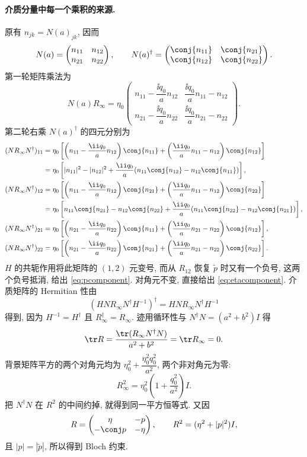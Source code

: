 \paragraph{介质分量中每一个乘积的来源.}
原有 $n_{jk}=N(a)_{jk}$, 因而
\[
N(a)=\begin{pmatrix}n_{11}&n_{12}\\n_{21}&n_{22}\end{pmatrix},\qquad
N(a)^\dagger=
\begin{pmatrix}\conj{n_{11}}&\conj{n_{21}}\\
\conj{n_{12}}&\conj{n_{22}}\end{pmatrix}.
\]
第一轮矩阵乘法为
\[
N(a)R_\infty
=\eta_0\begin{pmatrix}
n_{11}-\dfrac{\ii q_0}{a}n_{12}
&\dfrac{\ii q_0}{a}n_{11}-n_{12}\\
n_{21}-\dfrac{\ii q_0}{a}n_{22}
&\dfrac{\ii q_0}{a}n_{21}-n_{22}
\end{pmatrix}.
\]
第二轮右乘 $N(a)^\dagger$ 的四元分别为
\[
\begin{aligned}
(N R_\infty N^\dagger)_{11}
={}&\eta_0\left[
\left(n_{11}-\dfrac{\ii q_0}{a}n_{12}\right)\conj{n_{11}}
+\left(\dfrac{\ii q_0}{a}n_{11}-n_{12}\right)\conj{n_{12}}
\right]\\
={}&\eta_0\left[
|n_{11}|^2-|n_{12}|^2
+\dfrac{\ii q_0}{a}
(n_{11}\conj{n_{12}}-n_{12}\conj{n_{11}})
\right],\\
(N R_\infty N^\dagger)_{12}
={}&\eta_0\left[
\left(n_{11}-\dfrac{\ii q_0}{a}n_{12}\right)\conj{n_{21}}
+\left(\dfrac{\ii q_0}{a}n_{11}-n_{12}\right)\conj{n_{22}}
\right]\\
={}&\eta_0\left[
n_{11}\conj{n_{21}}-n_{12}\conj{n_{22}}
+\dfrac{\ii q_0}{a}
(n_{11}\conj{n_{22}}-n_{12}\conj{n_{21}})
\right],\\
(N R_\infty N^\dagger)_{21}
={}&\eta_0\left[
\left(n_{21}-\dfrac{\ii q_0}{a}n_{22}\right)\conj{n_{11}}
+\left(\dfrac{\ii q_0}{a}n_{21}-n_{22}\right)\conj{n_{12}}
\right],\\
(N R_\infty N^\dagger)_{22}
={}&\eta_0\left[
\left(n_{21}-\dfrac{\ii q_0}{a}n_{22}\right)\conj{n_{21}}
+\left(\dfrac{\ii q_0}{a}n_{21}-n_{22}\right)\conj{n_{22}}
\right].
\end{aligned}
\]
$H$ 的共轭作用将此矩阵的 $(1,2)$ 元变号,
而从 $R_{12}$ 恢复 $\widetilde p$ 时又有一个负号,
这两个负号抵消, 给出 \eqref{eq:pcomponent}.
对角元不变, 直接给出 \eqref{eq:etacomponent}.
介质矩阵的 Hermitian 性由
\[
(HN R_\infty N^\dagger H^{-1})^\dagger
=HN R_\infty N^\dagger H^{-1}
\]
得到, 因为 $H^{-1}=H^\dagger$ 且 $R_\infty^\dagger=R_\infty$.
迹用循环性与 $N^\dagger N=(a^2+b^2)I$ 得
\[
\tr R
=\dfrac{\tr(R_\infty N^\dagger N)}{a^2+b^2}
=\tr R_\infty=0.
\]
背景矩阵平方的两个对角元均为
$\eta_0^2+\dfrac{\eta_0^2q_0^2}{a^2}$, 两个非对角元为零:
\[
R_\infty^2
=\eta_0^2\left(1+\dfrac{q_0^2}{a^2}\right)I.
\]
把 $N^\dagger N$ 在 $R^2$ 的中间约掉, 就得到同一平方恒等式.
又因
\[
R=\begin{pmatrix}\eta&-p\\-\conj p&-\eta\end{pmatrix},\qquad
R^2=(\eta^2+|p|^2)I,
\]
且 $|p|=|\widetilde p|$, 所以得到 Bloch 约束.

